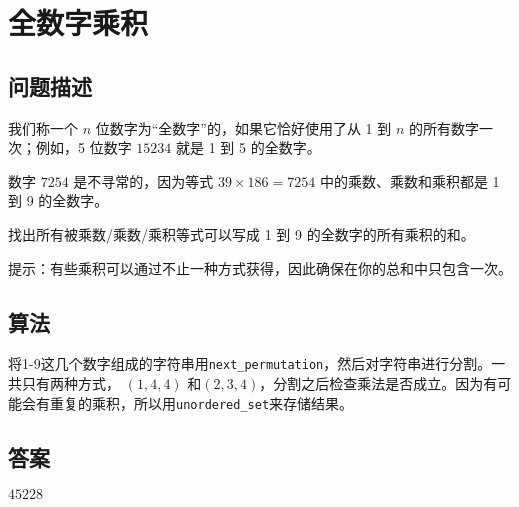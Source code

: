 \section{全数字乘积}\label{sec:problem32}
\subsection{问题描述}
\begin{tcolorbox}
	我们称一个 $n$ 位数字为“全数字”的，如果它恰好使用了从 1 到 $n$ 的所有数字一次；例如，5 位数字 $15234$ 就是 1 到 5 的全数字。

	数字 $7254$ 是不寻常的，因为等式 $39 \times 186 = 7254$ 中的乘数、乘数和乘积都是 1 到 9 的全数字。

	找出所有被乘数/乘数/乘积等式可以写成 1 到 9 的全数字的所有乘积的和。

	提示：有些乘积可以通过不止一种方式获得，因此确保在你的总和中只包含一次。
\end{tcolorbox}

\subsection{算法}
将1-9这几个数字组成的字符串用\texttt{next\_permutation}，然后对字符串进行分割。一共只有两种方式， \( (1,4,4)\) 和\( (2,3,4)
\)，分割之后检查乘法是否成立。因为有可能会有重复的乘积，所以用\texttt{unordered\_set}来存储结果。

\subsection{答案}
$45228$
